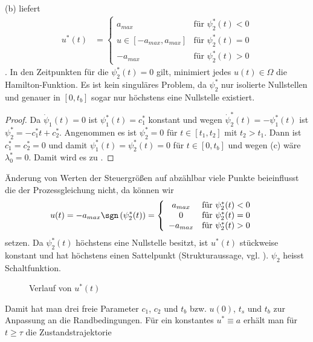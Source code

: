 \begin{exmp}
\begin{enumerate}[label=(\alph*)]
\end{enumerate}
(b) liefert 
\begin{align*}
u^{\ast}(t) & = \left\{\begin{array}{cl}
a_{max} & \text{für }\psi_2^{\ast}(t) < 0\\
u\in[-a_{max},a_{max}] & \text{für }\psi_2^{\ast}(t) = 0\\
-a_{max} & \text{für }\psi_2^{\ast}(t) > 0
\end{array} \right.
\end{align*}. In den Zeitpunkten für die $\psi_2^{\ast}(t)=0$ gilt, minimiert jedes $u(t)\in\Omega$ die Hamilton-Funktion. Es ist kein
singuläres Problem, da $\psi_2^{\ast}$ nur isolierte Nullstellen und genauer in $[0,t_b]$ sogar nur höchstens eine Nullstelle
existiert.\begin{proof}
Da $\dot{\psi}_1(t)=0$ ist $\psi_1^{\ast}(t)=c_1^{\ast}$ konstant und wegen $\dot{\psi}_2^{\ast}(t)=-\psi_1^{\ast}(t)$ ist
$\psi_2^{\ast}=-c_1^{\ast}t+c_2^{\ast}$. Angenommen es ist $\psi_2^{\ast}=0$ für $t\in[t_1,t_2]$ mit $t_2>t_1$. Dann ist $c_1^{\ast}=c_2^{\ast}=0$ und
damit $\psi_1^{\ast}(t)=\psi_2^{\ast}(t)=0$ für $t\in[0,t_b]$ und wegen (c) wäre $\lambda_0^{\ast}=0$. Damit wird es zu
.
\end{proof}
Änderung von Werten der Steuergrößen auf abzählbar viele Punkte beieinflusst die der Prozessgleichung nicht, da können wir 
\begin{align*}
	u(t) & = -a_{max}\sgn\left(\psi_2^{\ast}(t) \right) = \left\{\begin{array}{cl}
	a_{max} & \text{für }\psi_2^{\ast}(t) < 0\\
	0 & \text{für }\psi_2^{\ast}(t) = 0\\
	-a_{max} & \text{für }\psi_2^{\ast}(t) > 0
	\end{array} \right.
\end{align*}
setzen. Da $\psi_2^{\ast}(t)$ höchstens eine Nullstelle besitzt, ist $u^{\ast}(t)$ stückweise konstant und hat höchstens einen Sattelpunkt
(Strukturaussage, vgl. ). $\psi_2$ heisst Schaltfunktion.
\begin{figure}[htb]
	\centering
	
	\caption{Verlauf von $u^{\ast}(t)$}
	\label{fig:kap_2_bsp_1_uast_pont}
\end{figure}
Damit hat man drei freie Parameter $c_1$, $c_2$ und $t_b$ bzw. $u(0)$, $t_s$ und $t_b$ zur Anpassung an die Randbedingungen. Für ein konstantes
$u^{\ast}\equiv a$ erhält man für $t\geq \tau$ die Zustandstrajektorie

\end{exmp}

